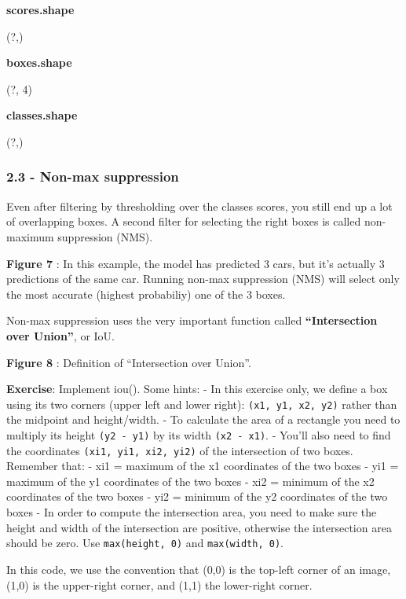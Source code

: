 \documentclass[11pt]{article}
\begin{document}
\textbf{scores.shape}

(?,)

\textbf{boxes.shape}

(?, 4)

\textbf{classes.shape}

(?,)

    \hypertarget{non-max-suppression}{%
\subsubsection{2.3 - Non-max suppression}\label{non-max-suppression}}

Even after filtering by thresholding over the classes scores, you still
end up a lot of overlapping boxes. A second filter for selecting the
right boxes is called non-maximum suppression (NMS).

     \textbf{Figure 7} : In this example, the model has predicted 3 cars,
but it's actually 3 predictions of the same car. Running non-max
suppression (NMS) will select only the most accurate (highest
probabiliy) one of the 3 boxes. 

    Non-max suppression uses the very important function called
\textbf{``Intersection over Union''}, or IoU.

 \textbf{Figure 8} : Definition of ``Intersection over Union''.

\textbf{Exercise}: Implement iou(). Some hints: - In this exercise only,
we define a box using its two corners (upper left and lower right):
\texttt{(x1,\ y1,\ x2,\ y2)} rather than the midpoint and height/width.
- To calculate the area of a rectangle you need to multiply its height
\texttt{(y2\ -\ y1)} by its width \texttt{(x2\ -\ x1)}. - You'll also
need to find the coordinates \texttt{(xi1,\ yi1,\ xi2,\ yi2)} of the
intersection of two boxes. Remember that: - xi1 = maximum of the x1
coordinates of the two boxes - yi1 = maximum of the y1 coordinates of
the two boxes - xi2 = minimum of the x2 coordinates of the two boxes -
yi2 = minimum of the y2 coordinates of the two boxes - In order to
compute the intersection area, you need to make sure the height and
width of the intersection are positive, otherwise the intersection area
should be zero. Use \texttt{max(height,\ 0)} and
\texttt{max(width,\ 0)}.

In this code, we use the convention that (0,0) is the top-left corner of
an image, (1,0) is the upper-right corner, and (1,1) the lower-right
corner.
\end{document}
